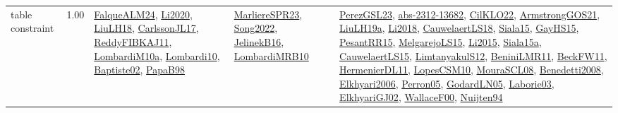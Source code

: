 {\begin{longtable}{p{3cm}r>{\raggedright\arraybackslash}p{6cm}>{\raggedright\arraybackslash}p{6cm}>{\raggedright\arraybackslash}p{8cm}}
\index{table constraint}\index{Constraints!table constraint}table constraint &  1.00 & \hyperref[detail:FalqueALM24]{FalqueALM24}, \hyperref[detail:Li2020]{Li2020}, \hyperref[detail:LiuLH18]{LiuLH18}, \hyperref[detail:CarlssonJL17]{CarlssonJL17}, \hyperref[detail:ReddyFIBKAJ11]{ReddyFIBKAJ11}, \hyperref[detail:LombardiM10a]{LombardiM10a}, \hyperref[detail:Lombardi10]{Lombardi10}, \hyperref[detail:Baptiste02]{Baptiste02}, \hyperref[detail:PapaB98]{PapaB98} & \hyperref[detail:MarliereSPR23]{MarliereSPR23}, \hyperref[detail:Song2022]{Song2022}, \hyperref[detail:JelinekB16]{JelinekB16}, \hyperref[detail:LombardiMRB10]{LombardiMRB10} & \hyperref[detail:PerezGSL23]{PerezGSL23}, \hyperref[detail:abs-2312-13682]{abs-2312-13682}, \hyperref[detail:CilKLO22]{CilKLO22}, \hyperref[detail:ArmstrongGOS21]{ArmstrongGOS21}, \hyperref[detail:LiuLH19a]{LiuLH19a}, \hyperref[detail:Li2018]{Li2018}, \hyperref[detail:CauwelaertLS18]{CauwelaertLS18}, \hyperref[detail:Siala15]{Siala15}, \hyperref[detail:GayHS15]{GayHS15}, \hyperref[detail:PesantRR15]{PesantRR15}, \hyperref[detail:MelgarejoLS15]{MelgarejoLS15}, \hyperref[detail:Li2015]{Li2015}, \hyperref[detail:Siala15a]{Siala15a}, \hyperref[detail:CauwelaertLS15]{CauwelaertLS15}, \hyperref[detail:LimtanyakulS12]{LimtanyakulS12}, \hyperref[detail:BeniniLMR11]{BeniniLMR11}, \hyperref[detail:BeckFW11]{BeckFW11}, \hyperref[detail:HermenierDL11]{HermenierDL11}, \hyperref[detail:LopesCSM10]{LopesCSM10}, \hyperref[detail:MouraSCL08]{MouraSCL08}, \hyperref[detail:Benedetti2008]{Benedetti2008}, \hyperref[detail:Elkhyari2006]{Elkhyari2006}, \hyperref[detail:Perron05]{Perron05}, \hyperref[detail:GodardLN05]{GodardLN05}, \hyperref[detail:Laborie03]{Laborie03}, \hyperref[detail:ElkhyariGJ02]{ElkhyariGJ02}, \hyperref[detail:WallaceF00]{WallaceF00}, \hyperref[detail:Nuijten94]{Nuijten94}\\
\end{longtable}
}

\clearpage

